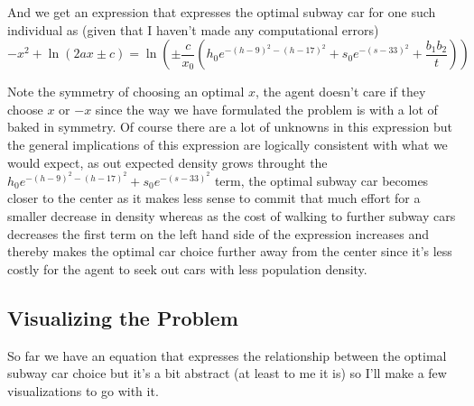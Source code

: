 \documentclass[11pt]{article}
\begin{document}
And we get an expression that expresses the optimal subway car for one
such individual as (given that I haven't made any computational errors)
\[-x^2 + \ln\left(2ax \pm c\right) = \ln\left(\pm\frac{ c}{x_0}\left(h_0e^{-(h-9)^2 - (h-17)^2} + s_0e^{-(s-33)^2} + \frac{b_1b_2}{t}\right)\right)\]

Note the symmetry of choosing an optimal \(x\), the agent doesn't care
if they choose \(x\) or \(-x\) since the way we have formulated the
problem is with a lot of baked in symmetry. Of course there are a lot of
unknowns in this expression but the general implications of this
expression are logically consistent with what we would expect, as out
expected density grows throught the
\(h_0e^{-(h-9)^2 - (h-17)^2} + s_0e^{-(s-33)^2}\) term, the optimal
subway car becomes closer to the center as it makes less sense to commit
that much effort for a smaller decrease in density whereas as the cost
of walking to further subway cars decreases the first term on the left
hand side of the expression increases and thereby makes the optimal car
choice further away from the center since it's less costly for the agent
to seek out cars with less population density.

    \hypertarget{visualizing-the-problem}{%
\subsection{Visualizing the Problem}\label{visualizing-the-problem}}

So far we have an equation that expresses the relationship between the
optimal subway car choice but it's a bit abstract (at least to me it is)
so I'll make a few visualizations to go with it.
\end{document}

